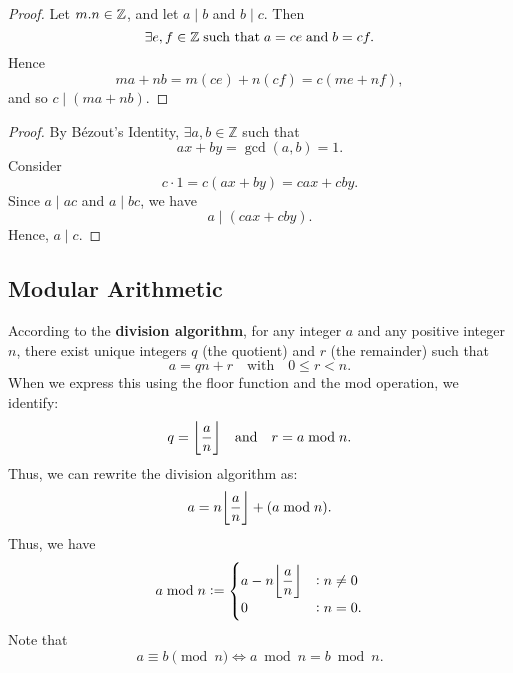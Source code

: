 \documentclass[11pt,openany]{article}
\begin{document}
\newpage
{}
\begin{proof}
	Let $m.n\in\mathbb{Z}$, and let $a\mid b$ and $b\mid c$. Then \[
	\exists e, f\in\mathbb{Z}\;\text{such that}\; a=ce\;\text{and}\; b=cf.
	\] Hence \[
	ma+nb=m(ce)+n(cf)=c(me+nf),
	\] and so $c\mid (ma+nb)$.
\end{proof}
\vspace{50pt}
\begin{proof}
By Bézout's Identity, \( \exists a,b\in\mathbb{Z} \) such that \[
ax+by=\gcd(a,b)=1.
\] Consider \[
c\cdot 1= c(ax+by)=cax+cby.
\] Since $a\mid ac$ and $a\mid bc$, we have \[
a\mid (cax+cby).
\] Hence, $a\mid c$.
\end{proof}
\newpage
\subsection{Modular Arithmetic}
\begin{remark*}
According to the \textbf{division algorithm}, for any integer 
$a$ and any positive integer $n$, there exist unique integers 
$q$ (the quotient) and $r$ (the remainder) such that \[
a=qn+r\quad\text{with}\quad 0\leq r< n.
\] When we express this using the floor function and the mod operation, we identify: \[
q=\floor*{\frac{a}{n}}\quad\text{and}\quad r= a\bmod n.
\] Thus,  we can rewrite the division algorithm as: \[
a=n\floor*{\frac{a}{n}}+(a\bmod n).
\] Thus, we have \[
a\bmod n:=\begin{cases}
	\displaystyle a-n\floor*{\frac{a}{n}} &: n\neq 0\\
	\displaystyle 0 &: n= 0.
\end{cases}
\] Note that \[
a\equiv b\pmod{n}\iff a\bmod n=b\bmod n.
\]
\end{remark*}
\end{document}
